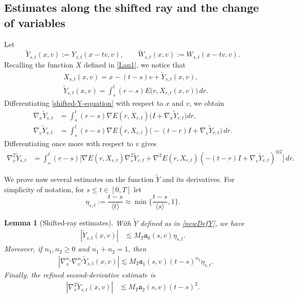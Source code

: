 \documentclass[reqno,11pt]{amsart}
\numberwithin{equation}{section}
\newtheorem{lemma}[theorem]{Lemma}
\begin{document}
	\subsection{Estimates along the shifted ray and the change of variables} Let
	\begin{equation}\label{newDefY}
	\widetilde Y_{s,t}(x,v):=Y_{s,t}(x-tv,v),\qquad \widetilde W_{s,t}(x,v):=W_{s,t}(x-tv,v).
	\end{equation}
	Recalling the function $X$ defined in \eqref{Lan1}, we notice that
	\begin{equation}\label{shifted-Y-equation}
	\begin{split}
	&X_{s,t}(x,v)=x-(t-s)v+\widetilde Y_{s,t}(x,v),\\
	&\widetilde Y_{s,t}(x,v)=\int_s^t(r-s)E\bigl(r,X_{r,t}(x,v)\bigr)\,dr.
	\end{split}
	\end{equation}
Differentiating \eqref{shifted-Y-equation} with respect to $x$ and $v$, we obtain
\begin{align}
	\nabla_x\widetilde Y_{s,t}&=\int_s^t(r-s)\nabla E(r,X_{r,t})\big(I+\nabla_x\widetilde Y_{r,t}\big)dr,
	\label{shifted-x-system}\\
	\nabla_v\widetilde Y_{s,t}&=\int_s^t(r-s)\nabla E(r,X_{r,t})\big(-(t-r)I+\nabla_v\widetilde Y_{r,t}\big)\,dr.
	\label{shifted-v-system}
\end{align}
Differentiating once more with respect to $v$ gives
\begin{align}
	\nabla_v^2\widetilde Y_{s,t}
	&=\int_s^t(r-s)\Big[\nabla E(r,X_{r,t})\nabla_v^2\widetilde Y_{r,t}+
	\nabla^2E(r,X_{r,t})(-(t-r)I+\nabla_v\widetilde Y_{r,t})^{\otimes 2}\Big]\,dr.
	\label{shifted-vv-system}
\end{align}

We prove now several estimates on the function $\widetilde{Y}$ and its derivatives. For simplicity of notation, for $s\leq t\in[0,T]$ let
	\begin{equation}\label{etast}
		\eta_{s,t}:=\frac{t-s}{\langle t\rangle}\approx\min\Big\{\frac{t-s}{\langle s\rangle},1\Big\}.
	\end{equation}

	\begin{lemma}[Shifted-ray estimates]\label{lem:shifted-ray} With $\widetilde{Y}$ defined as in \eqref{newDefY}, we have
		\begin{align}
			|\widetilde Y_{s,t}(x,v)|
			&\lesssim M_T\mathfrak{a}_0(s,v)\eta_{s,t}.
			\label{z80a}
		\end{align}
		Moreover, if $n_1,n_2\ge0$ and $n_1+n_2=1$, then
	\begin{align}\label{z80'b}
	&\left|\nabla_x^{n_1}\nabla_v^{n_2}\widetilde Y_{s,t}(x,v)\right|\lesssim M_T\mathfrak{a}_1(s,v)(t-s)^{n_2}\eta_{s,t}.
	\end{align}
	Finally, the refined second-derivative estimate is
	\begin{align}\label{z80'c}
		\left|\nabla_v^2\widetilde Y_{s,t}(x,v)\right|&\lesssim M_T\mathfrak{a}_2(s,v)(t-s)^2.
	\end{align}
	\end{lemma}
	
\end{document}
